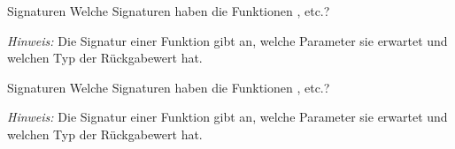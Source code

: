 \begin{task}{Signaturen}
    Welche Signaturen haben die Funktionen ,  etc.?

    \emph{Hinweis:}
    Die Signatur einer Funktion gibt an, welche Parameter sie erwartet und
    welchen Typ der Rückgabewert hat.
\end{task}

\begin{task}{Signaturen}
    Welche Signaturen haben die Funktionen ,  etc.?

    \emph{Hinweis:}
    Die Signatur einer Funktion gibt an, welche Parameter sie erwartet und
    welchen Typ der Rückgabewert hat.
\end{task}
